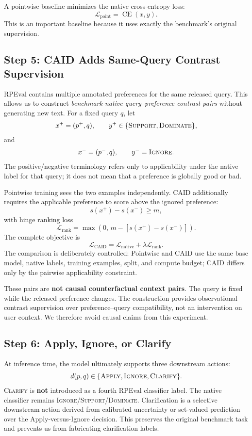 \documentclass[11pt]{article}
\begin{document}
A pointwise baseline minimizes the native cross-entropy loss:
\[
\mathcal{L}_{\text{point}}
=
\operatorname{CE}(x,y).
\]
This is an important baseline because it uses exactly the benchmark's original supervision.

\subsection{Step 5: CAID Adds Same-Query Contrast Supervision}

RPEval contains multiple annotated preferences for the same released query. This allows us to construct \emph{benchmark-native query--preference contrast pairs} without generating new text. For a fixed query $q$, let
\[
x^{+}=(p^{+},q),
\qquad
y^{+}\in\{\textsc{Support},\textsc{Dominate}\},
\]
and
\[
x^{-}=(p^{-},q),
\qquad
y^{-}=\textsc{Ignore}.
\]
The positive/negative terminology refers only to applicability under the native label for that query; it does not mean that a preference is globally good or bad.

Pointwise training sees the two examples independently. CAID additionally requires the applicable preference to score above the ignored preference:
\[
s(x^{+})-s(x^{-})\ge m,
\]
with hinge ranking loss
\[
\mathcal{L}_{\text{rank}}
=
\max\left(0,\,
m-\left[s(x^{+})-s(x^{-})\right]\right).
\]
The complete objective is
\[
\mathcal{L}_{\text{CAID}}
=
\mathcal{L}_{\text{native}}
+
\lambda\mathcal{L}_{\text{rank}}.
\]
The comparison is deliberately controlled: Pointwise and CAID use the same base model, native labels, training examples, split, and compute budget; CAID differs only by the pairwise applicability constraint.

These pairs are \textbf{not causal counterfactual context pairs}. The query is fixed while the released preference changes. The construction provides observational contrast supervision over preference--query compatibility, not an intervention on user context. We therefore avoid causal claims from this experiment.

\subsection{Step 6: Apply, Ignore, or Clarify}

At inference time, the model ultimately supports three downstream actions:
\[
d(p,q)\in\{\textsc{Apply},\textsc{Ignore},\textsc{Clarify}\}.
\]
\textsc{Clarify} is \textbf{not} introduced as a fourth RPEval classifier label. The native classifier remains \textsc{Ignore}/\textsc{Support}/\textsc{Dominate}. Clarification is a selective downstream action derived from calibrated uncertainty or set-valued prediction over the Apply-versus-Ignore decision. This preserves the original benchmark task and prevents us from fabricating clarification labels.
\end{document}
